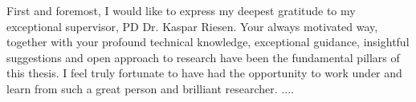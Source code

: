 \begin{acknowledgments}

First and foremost, I would like to express my deepest gratitude to my exceptional supervisor, PD Dr. Kaspar Riesen. Your always motivated way, together with your profound technical knowledge, exceptional guidance, insightful suggestions and open approach to research have been the fundamental pillars of this thesis. I feel truly fortunate to have had the opportunity to work under and learn from such a great person and brilliant researcher. ....

\end{acknowledgments}